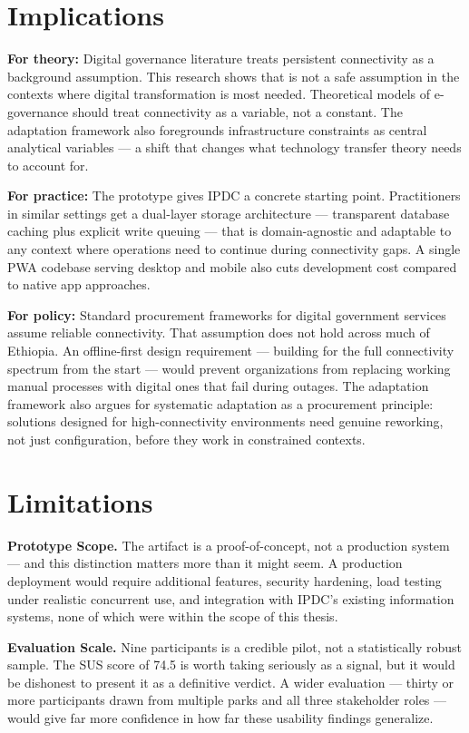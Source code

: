 \section{Implications}

\textbf{For theory:} Digital governance literature treats persistent connectivity as a background assumption. This research shows that is not a safe assumption in the contexts where digital transformation is most needed. Theoretical models of e-governance should treat connectivity as a variable, not a constant. The adaptation framework also foregrounds infrastructure constraints as central analytical variables --- a shift that changes what technology transfer theory needs to account for.

\textbf{For practice:} The prototype gives IPDC a concrete starting point. Practitioners in similar settings get a dual-layer storage architecture --- transparent database caching plus explicit write queuing --- that is domain-agnostic and adaptable to any context where operations need to continue during connectivity gaps. A single PWA codebase serving desktop and mobile also cuts development cost compared to native app approaches.

\textbf{For policy:} Standard procurement frameworks for digital government services assume reliable connectivity. That assumption does not hold across much of Ethiopia. An offline-first design requirement --- building for the full connectivity spectrum from the start --- would prevent organizations from replacing working manual processes with digital ones that fail during outages. The adaptation framework also argues for systematic adaptation as a procurement principle: solutions designed for high-connectivity environments need genuine reworking, not just configuration, before they work in constrained contexts.

\section{Limitations}

\textbf{Prototype Scope.} The artifact is a proof-of-concept, not a production system --- and this distinction matters more than it might seem. A production deployment would require additional features, security hardening, load testing under realistic concurrent use, and integration with IPDC's existing information systems, none of which were within the scope of this thesis.

\textbf{Evaluation Scale.} Nine participants is a credible pilot, not a statistically robust sample. The SUS score of 74.5 is worth taking seriously as a signal, but it would be dishonest to present it as a definitive verdict. A wider evaluation --- thirty or more participants drawn from multiple parks and all three stakeholder roles --- would give far more confidence in how far these usability findings generalize.

